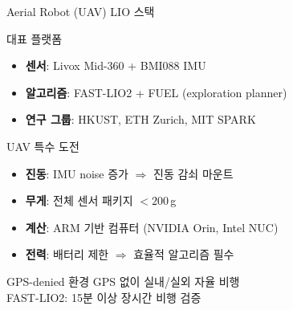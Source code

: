 \begin{frame}{Aerial Robot (UAV) LIO 스택}
  \begin{block}{대표 플랫폼}
    \begin{itemize}
      \item \textbf{센서}: Livox Mid-360 + BMI088 IMU
      \item \textbf{알고리즘}: FAST-LIO2 + FUEL (exploration planner)
      \item \textbf{연구 그룹}: HKUST, ETH Zurich, MIT SPARK
    \end{itemize}
  \end{block}
  \pause
  \begin{block}{UAV 특수 도전}
    \begin{itemize}
      \item \textbf{진동}: IMU noise 증가 $\Rightarrow$ 진동 감쇠 마운트
      \item \textbf{무게}: 전체 센서 패키지 $<200\,$g
      \item \textbf{계산}: ARM 기반 컴퓨터 (NVIDIA Orin, Intel NUC)
      \item \textbf{전력}: 배터리 제한 $\Rightarrow$ 효율적 알고리즘 필수
    \end{itemize}
  \end{block}
  \pause
  \begin{exampleblock}{GPS-denied 환경}
    GPS 없이 실내/실외 자율 비행\\
    FAST-LIO2: 15분 이상 장시간 비행 검증
  \end{exampleblock}
\end{frame}

